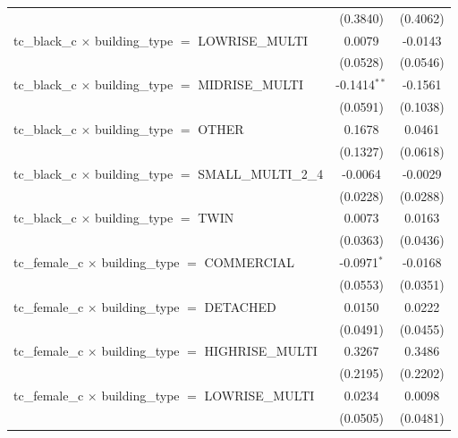 \begin{tabular}{lcc}
                                                                       & (0.3840)       & (0.4062)\\   
   tc\_black\_c $\times$ building\_type $=$ LOWRISE\_MULTI             & 0.0079         & -0.0143\\   
                                                                       & (0.0528)       & (0.0546)\\   
   tc\_black\_c $\times$ building\_type $=$ MIDRISE\_MULTI             & -0.1414$^{**}$ & -0.1561\\   
                                                                       & (0.0591)       & (0.1038)\\   
   tc\_black\_c $\times$ building\_type $=$ OTHER                      & 0.1678         & 0.0461\\   
                                                                       & (0.1327)       & (0.0618)\\   
   tc\_black\_c $\times$ building\_type $=$ SMALL\_MULTI\_2\_4         & -0.0064        & -0.0029\\   
                                                                       & (0.0228)       & (0.0288)\\   
   tc\_black\_c $\times$ building\_type $=$ TWIN                       & 0.0073         & 0.0163\\   
                                                                       & (0.0363)       & (0.0436)\\   
   tc\_female\_c $\times$ building\_type $=$ COMMERCIAL                & -0.0971$^{*}$  & -0.0168\\   
                                                                       & (0.0553)       & (0.0351)\\   
   tc\_female\_c $\times$ building\_type $=$ DETACHED                  & 0.0150         & 0.0222\\   
                                                                       & (0.0491)       & (0.0455)\\   
   tc\_female\_c $\times$ building\_type $=$ HIGHRISE\_MULTI           & 0.3267         & 0.3486\\   
                                                                       & (0.2195)       & (0.2202)\\   
   tc\_female\_c $\times$ building\_type $=$ LOWRISE\_MULTI            & 0.0234         & 0.0098\\   
                                                                       & (0.0505)       & (0.0481)\\   

\end{tabular}
